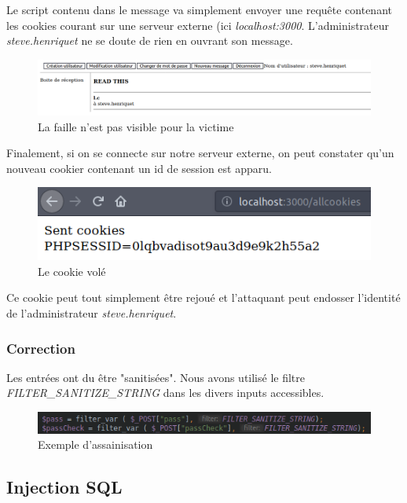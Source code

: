\documentclass[12pt]{article}
\begin{document}
Le script contenu dans le message va simplement envoyer une requête contenant les cookies courant sur une serveur externe (ici \textit{localhost:3000}. L'administrateur \textit{steve.henriquet} ne se doute de rien en ouvrant son message.

\begin{figure}[H]
\centering
\includegraphics[width=\linewidth]{images/cookieStealing.png}
\caption{La faille n'est pas visible pour la victime}
\end{figure}

Finalement, si on se connecte sur notre serveur externe, on peut constater qu'un nouveau cookier contenant un id de session est apparu.

\begin{figure}[H]
\centering
\includegraphics[width=\linewidth]{images/cookieStolen.png}
\caption{Le cookie volé}
\end{figure}

Ce cookie peut tout simplement être rejoué et l'attaquant peut endosser l'identité de l'administrateur \textit{steve.henriquet}.


\subsubsection{Correction}
Les entrées ont du être "sanitisées". Nous avons utilisé le filtre \textit{FILTER\_SANITIZE\_STRING} dans les divers inputs accessibles.
\begin{figure}[H]
\centering
\includegraphics[width=\linewidth]{images/sanitize.png}
\caption{Exemple d'assainisation}
\end{figure}

\subsection{Injection SQL}
\end{document}
